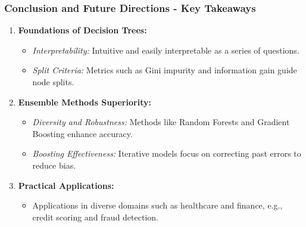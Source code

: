 \documentclass[aspectratio=169]{beamer}
\begin{document}
\begin{frame}[fragile]
    \frametitle{Conclusion and Future Directions - Key Takeaways}
    \begin{enumerate}
        \item \textbf{Foundations of Decision Trees:}
        \begin{itemize}
            \item \textit{Interpretability:} Intuitive and easily interpretable as a series of questions.
            \item \textit{Split Criteria:} Metrics such as Gini impurity and information gain guide node splits.
        \end{itemize}

        \item \textbf{Ensemble Methods Superiority:}
        \begin{itemize}
            \item \textit{Diversity and Robustness:} Methods like Random Forests and Gradient Boosting enhance accuracy.
            \item \textit{Boosting Effectiveness:} Iterative models focus on correcting past errors to reduce bias.
        \end{itemize}

        \item \textbf{Practical Applications:}
        \begin{itemize}
            \item Applications in diverse domains such as healthcare and finance, e.g., credit scoring and fraud detection.
        \end{itemize}
    \end{enumerate}
\end{frame}
\end{document}
